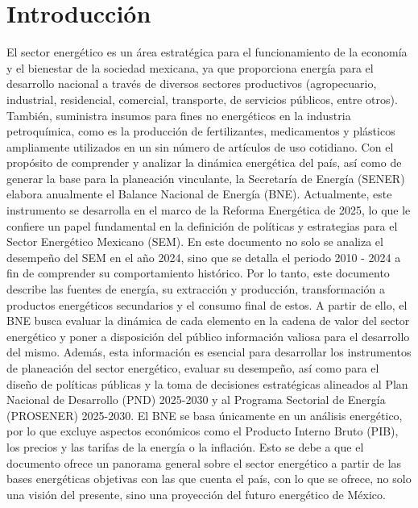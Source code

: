 \documentclass{sener2025}
\begin{document}

\section{Introducción}

El sector energético es un área estratégica para el funcionamiento de la economía y el bienestar de la sociedad mexicana, ya que proporciona energía para el desarrollo nacional a través de diversos sectores productivos (agropecuario, industrial, residencial, comercial, transporte, de servicios públicos, entre otros). También, suministra insumos para fines no energéticos en la industria petroquímica, como es la producción de fertilizantes, medicamentos y plásticos ampliamente utilizados en un sin número de artículos de uso cotidiano.
Con el propósito de comprender y analizar la dinámica energética del país, así como de generar la base para la planeación vinculante, la Secretaría de Energía (SENER) elabora anualmente el Balance Nacional de Energía (BNE). Actualmente, este instrumento se desarrolla en el marco de la Reforma Energética de 2025, lo que le confiere un papel fundamental en la definición de políticas y estrategias para el Sector Energético Mexicano (SEM).
En este documento no solo se analiza el desempeño del SEM en el año 2024, sino que se detalla el periodo 2010 - 2024 a fin de comprender su comportamiento histórico. Por lo tanto, este documento describe las fuentes de energía, su extracción y producción, transformación a productos energéticos secundarios y el consumo final de estos. A partir de ello, el BNE busca evaluar la dinámica de cada elemento en la cadena de valor del sector energético y poner a disposición del público información valiosa para el desarrollo del mismo.
Además, esta información es esencial para desarrollar los instrumentos de planeación del sector energético, evaluar su desempeño, así como para el diseño de políticas públicas y la toma de decisiones estratégicas alineados al Plan Nacional de Desarrollo (PND) 2025-2030 y al Programa Sectorial de Energía (PROSENER) 2025-2030.
El BNE se basa únicamente en un análisis energético, por lo que excluye aspectos económicos como el Producto Interno Bruto (PIB), los precios y las tarifas de la energía o la inflación. Esto se debe a que el documento ofrece un panorama general sobre el sector energético a partir de las bases energéticas objetivas con las que cuenta el país, con lo que se ofrece, no solo una visión del presente, sino una proyección del futuro energético de México.
\end{document}
